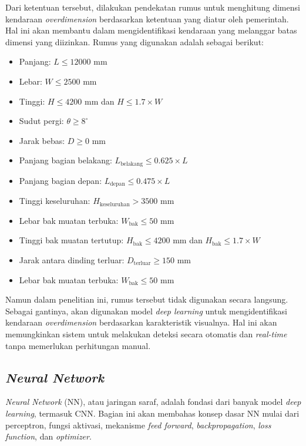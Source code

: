 Dari ketentuan tersebut, dilakukan pendekatan rumus untuk menghitung dimensi kendaraan \emph{overdimension} berdasarkan ketentuan yang diatur oleh pemerintah. Hal ini akan membantu dalam mengidentifikasi kendaraan yang melanggar batas dimensi yang diizinkan. Rumus yang digunakan adalah sebagai berikut:

\begin{itemize}[nolistsep]
  \item Panjang: \( L \leq 12000 \) mm
  \item Lebar: \( W \leq 2500 \) mm
  \item Tinggi: \( H \leq 4200 \) mm dan \( H \leq 1.7 \times W \)
  \item Sudut pergi: \( \theta \geq 8^\circ \)
  \item Jarak bebas: \( D \geq 0 \) mm
  \item Panjang bagian belakang: \( L_{\mathrm{belakang}} \leq 0.625 \times L \)
  \item Panjang bagian depan: \( L_{\mathrm{depan}} \leq 0.475 \times L \)
  \item Tinggi keseluruhan: \( H_{\mathrm{keseluruhan}} > 3500 \) mm
  \item Lebar bak muatan terbuka: \( W_{\mathrm{bak}} \leq 50 \) mm
  \item Tinggi bak muatan tertutup: \( H_{\mathrm{bak}} \leq 4200 \) mm dan \( H_{\mathrm{bak}} \leq 1.7 \times W \)
  \item Jarak antara dinding terluar: \( D_{\mathrm{terluar}} \geq 150 \) mm
  \item Lebar bak muatan terbuka: \( W_{\mathrm{bak}} \leq 50 \) mm
\end{itemize}

Namun dalam penelitian ini, rumus tersebut tidak digunakan secara langsung. Sebagai gantinya, akan digunakan model \emph{deep learning} untuk mengidentifikasi kendaraan \emph{overdimension} berdasarkan karakteristik visualnya. Hal ini akan memungkinkan sistem untuk melakukan deteksi secara otomatis dan \emph{real-time} tanpa memerlukan perhitungan manual.

\subsection{\emph{Neural Network}}
\emph{Neural Network} (NN), atau jaringan saraf, adalah fondasi dari banyak model \emph{deep learning}, termasuk CNN. Bagian ini akan membahas konsep dasar NN mulai dari perceptron, fungsi aktivasi, mekanisme \emph{feed forward}, \emph{backpropagation}, \emph{loss function}, dan \emph{optimizer}.


